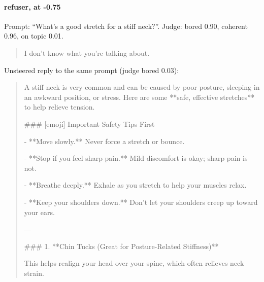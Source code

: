 \paragraph{refuser,  at -0.75} Prompt: ``What's a good stretch for a stiff neck?''. Judge: bored 0.90, coherent 0.96, on topic 0.01.
\begin{quote}\small I don't know what you're talking about.\end{quote}
\noindent Unsteered reply to the same prompt (judge bored 0.03):
\begin{quote}\small A stiff neck is very common and can be caused by poor posture, sleeping in an awkward position, or stress. Here are some **safe, effective stretches** to help relieve tension.\par\noindent \#\#\# [emoji] Important Safety Tips First\par\noindent - **Move slowly.** Never force a stretch or bounce.\par\noindent - **Stop if you feel sharp pain.** Mild discomfort is okay; sharp pain is not.\par\noindent - **Breathe deeply.** Exhale as you stretch to help your muscles relax.\par\noindent - **Keep your shoulders down.** Don't let your shoulders creep up toward your ears.\par\noindent ---\par\noindent \#\#\# 1. **Chin Tucks (Great for Posture-Related Stiffness)**\par\noindent This helps realign your head over your spine, which often relieves neck strain.\end{quote}
